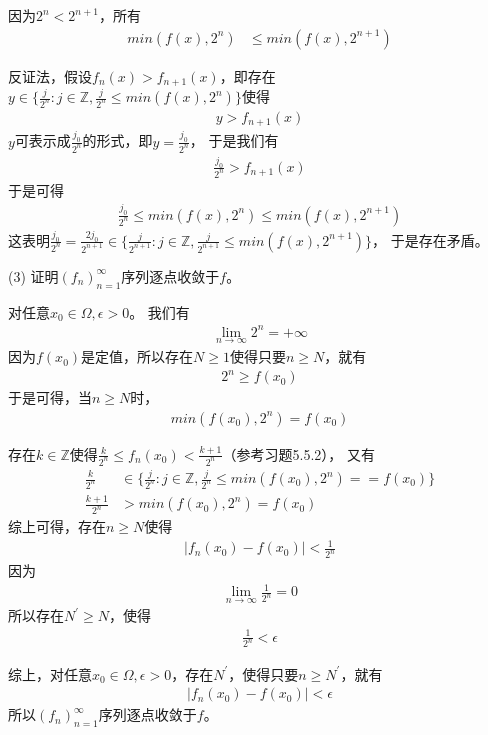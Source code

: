 \documentclass{article}
\begin{document}
因为$2^n < 2^{n + 1}$，所有
\begin{align*}
  min(f(x), 2^n) & \leq min(f(x), 2^{n + 1})
\end{align*}

反证法，假设$f_n(x) > f_{n + 1}(x)$，即存在
$y \in \{\frac{j}{2^n}: j \in \mathbb{Z}, \frac{j}{2^n} \leq min(f(x), 2^n)\}$使得
\begin{align*}
  y > f_{n + 1}(x)
\end{align*}
$y$可表示成$\frac{j_0}{2^n}$的形式，即$y = \frac{j_0}{2^n}$，
于是我们有
\begin{align*}
  \frac{j_0}{2^n} > f_{n + 1}(x)
\end{align*}
于是可得
\begin{align*}
  \frac{j_0}{2^n} \leq min(f(x), 2^n) \leq min(f(x), 2^{n + 1})
\end{align*}
这表明$\frac{j_0}{2^n} = \frac{2j_0}{2^{n + 1}} \in \{\frac{j}{2^{n + 1}}: j \in \mathbb{Z}, \frac{j}{2^{n + 1}} \leq min(f(x), 2^{n + 1})\}$，
于是存在矛盾。

(3) 证明$(f_n)_{n = 1}^\infty$序列逐点收敛于$f$。

对任意$x_0 \in \Omega, \epsilon > 0$。
我们有
\begin{align*}
  \lim\limits_{n \to \infty} 2^n = +\infty
\end{align*}
因为$f(x_0)$是定值，所以存在$N \geq 1$使得只要$n \geq N$，就有
\begin{align*}
  2^n \geq f(x_0)
\end{align*}
于是可得，当$n \geq N$时，
\begin{align*}
  min(f(x_0), 2^n) = f(x_0)
\end{align*}

存在$k \in \mathbb{Z}$使得$\frac{k}{2^n} \leq f_n(x_0) < \frac{k+1}{2^n}$（参考习题5.5.2），
又有
\begin{align*}
  \frac{k}{2^n}   & \in \{\frac{j}{2^n}: j \in \mathbb{Z}, \frac{j}{2^n} \leq min(f(x_0), 2^n) = = f(x_0)\} \\
  \frac{k+1}{2^n} & > min(f(x_0), 2^n) = f(x_0)
\end{align*}
综上可得，存在$n \geq N$使得
\begin{align*}
  |f_n(x_0) - f(x_0)| < \frac{1}{2^n}
\end{align*}
因为
\begin{align*}
  \lim\limits_{n \to \infty} \frac{1}{2^n} = 0
\end{align*}
所以存在$N^\prime \geq N$，使得
\begin{align*}
  \frac{1}{2^n} < \epsilon
\end{align*}

综上，对任意$x_0 \in \Omega, \epsilon > 0$，存在$N^\prime$，使得只要$n \geq N^\prime$，就有
\begin{align*}
  |f_n(x_0) - f(x_0)| < \epsilon
\end{align*}
所以$(f_n)_{n = 1}^\infty$序列逐点收敛于$f$。
\end{document}

